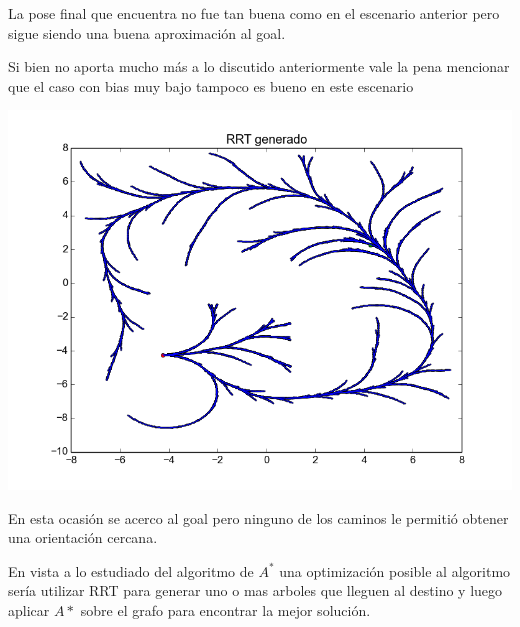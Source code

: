 La pose final que encuentra no fue tan buena como en el escenario anterior pero sigue siendo una buena aproximación al goal.

Si bien no aporta mucho más a lo discutido anteriormente vale la pena mencionar que el caso con bias muy bajo tampoco es bueno en este escenario

\includegraphics[scale=0.5]{tp4_imagenes/informe_goal_bias_dificl_01.png}

En esta ocasión se acerco al goal pero ninguno de los caminos le permitió obtener una orientación cercana.

En vista a lo estudiado del algoritmo de $A^*$ una optimización posible al algoritmo sería utilizar RRT para generar uno o mas arboles que lleguen al destino y luego aplicar $A*$ sobre el grafo para encontrar la mejor solución.

